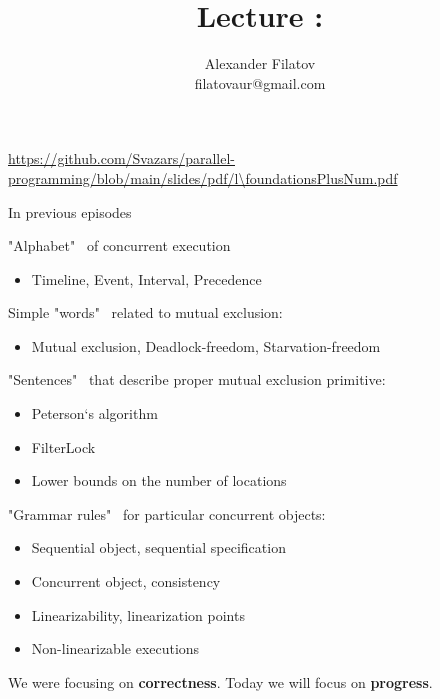 


\newcommand{\thisLectureNum}{\foundationsPlusNum}

\title[]{Lecture \thisLectureNum: \foundationsPlusTopic}
\subtitle[]{\foundationsPlusKey}
\author[]{Alexander Filatov\\ filatovaur@gmail.com}

\date{}



\begin{frame}
  \titlepage
  \url{https://github.com/Svazars/parallel-programming/blob/main/slides/pdf/l\thisLectureNum.pdf}
\end{frame}

\begin{frame}{In previous episodes}

"Alphabet" \ of concurrent execution
\begin{itemize}
  \item Timeline, Event, Interval, Precedence
\end{itemize}

Simple "words" \ related to mutual exclusion:
\begin{itemize}
  \item Mutual exclusion, Deadlock-freedom, Starvation-freedom
\end{itemize}

"Sentences" \ that describe proper mutual exclusion primitive:
\begin{itemize}
  \item Peterson`s algorithm
  \item FilterLock
  \item Lower bounds on the number of locations
\end{itemize}

"Grammar rules" \ for particular concurrent objects:
\begin{itemize}
  \item Sequential object, sequential specification
  \item Concurrent object, consistency
  \item Linearizability, linearization points
  \item Non-linearizable executions
\end{itemize}

\pause
We were focusing on \textbf{correctness}. Today we will focus on \textbf{progress}.

\end{frame}


